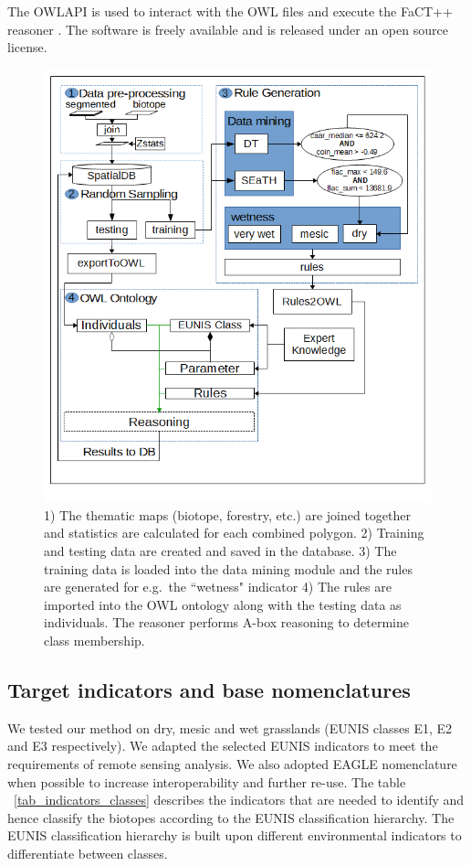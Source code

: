 \documentclass[authoryear, review,12pt,number]{elsarticle}
\begin{document}
The OWLAPI is used to interact with the OWL files and execute the FaCT++
reasoner \citep{Tsarkov2006}. The software is freely available and is released
under an open source license. 
\begin{figure}
\includegraphics[width=1\linewidth]{diagrams/another_workflow_diagram_large.png}
\caption
    {
        1) The thematic maps (biotope, forestry, etc.) are joined together and
        statistics are calculated for each combined polygon.
        2) Training and testing data are created and saved in the database.
        3) The training data is loaded into the data mining module and the
        rules are generated for e.g.\ the ``wetness" indicator
        4) The rules are imported into the OWL ontology along with the testing
        data as individuals. The reasoner performs A-box reasoning to determine
        class membership.
    } 
\label{fig_full_workflow}
\end{figure}
\subsection{Target indicators and base nomenclatures}
We tested our method on dry, mesic and wet grasslands (EUNIS classes E1, E2 and
E3 respectively). We adapted the selected EUNIS indicators to meet the
requirements of remote sensing analysis. We also adopted EAGLE nomenclature when
possible to increase interoperability and further re-use. The table
~\ref{tab_indicators_classes} describes the indicators that are needed to
identify and hence classify the biotopes according to the EUNIS classification
hierarchy. The EUNIS classification hierarchy is built upon different
environmental indicators to differentiate between classes. 
\end{document}
